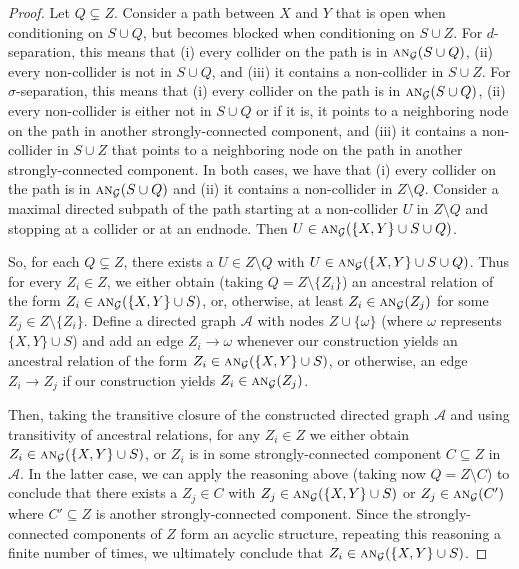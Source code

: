 \documentclass[twoside,11pt]{article}
\newenvironment{customlem}[1]
  {\renewcommand\theinnercustomlem{#1}\innercustomlem}
  {\endinnercustomlem}
\newcommand\C[1]{\mathcal{#1}}
\newcommand\mathbfsc[1]{\text{\normalfont\scshape#1}}
\newcommand\ansub[2]{\mathbfsc{an}_{#1}(#2)}
\begin{document}
\begin{customlem}{\ref{lemm:min_sep}}
\cmdLemmaMinSep
\end{customlem}
\begin{proof}
Let $Q \subsetneq Z$.
Consider a path between $X$ and $Y$ that is open when conditioning on $S \cup Q$, but becomes blocked when conditioning on $S \cup Z$. 
  For $d$-separation, this means that (i) every collider on the path is in $\ansub{\C{G}}{S \cup Q}$, (ii) every non-collider is not in $S \cup Q$, and (iii) it contains a non-collider in $S\cup Z$.
  For $\sigma$-separation, this means that (i) every collider on the path is in $\ansub{\C{G}}{S \cup Q}$, (ii) every non-collider is either not in $S \cup Q$ or if it is, it points to a neighboring node on the path in another strongly-connected component, and (iii) it contains a non-collider in $S\cup Z$ that points to a neighboring node on the path in another strongly-connected component. 
  In both cases, we have that (i) every collider on the path is in $\ansub{\C{G}}{S \cup Q}$ and (ii) it contains a non-collider in $Z \setminus Q$.
Consider a maximal directed subpath of the path starting at a non-collider $U$ in $Z \setminus Q$ and stopping at a collider or at an endnode.
  Then $U \in \ansub{\C{G}}{\{X,Y\} \cup S \cup Q}$. 

  So, for each $Q \subsetneq Z$, there exists a $U \in Z\setminus Q$ with $U \in \ansub{\C{G}}{\{X,Y\} \cup S \cup Q}$.
Thus for every $Z_i \in Z$, we either obtain (taking $Q = Z \setminus \{Z_i\}$) an ancestral relation of the form $Z_i \in \ansub{\C{G}}{\{X,Y\} \cup S}$, or, otherwise, at least $Z_i \in \ansub{\C{G}}{Z_j}$ for some $Z_j \in Z \setminus \{Z_i\}$. Define a directed graph $\C{A}$ with nodes $Z \cup \{\omega\}$ (where $\omega$ represents $\{X,Y\}\cup S$) and add an edge $Z_i \to \omega$ whenever our construction yields an ancestral relation of the form $Z_i \in \ansub{\C{G}}{\{X,Y\} \cup S}$, or otherwise, an edge $Z_i \to Z_j$ if our construction yields $Z_i \in \ansub{\C{G}}{Z_j}$.
 
  Then, taking the transitive closure of the constructed directed graph $\C{A}$ and using transitivity of ancestral relations, for any $Z_i \in Z$ we either obtain $Z_i \in \ansub{\C{G}}{\{X,Y\} \cup S}$, or $Z_i$ is in some strongly-connected component $C \subseteq Z$ in $\C{A}$. In the latter case, we can apply the reasoning above (taking now $Q = Z \setminus C$) to conclude that there exists a $Z_j \in C$ with $Z_j \in \ansub{\C{G}}{\{X,Y\} \cup S}$ or $Z_j \in \ansub{\C{G}}{C'}$ where $C' \subseteq Z$ is another strongly-connected component. Since the strongly-connected components of $Z$ form an acyclic structure, repeating this reasoning a finite number of times, we ultimately conclude that $Z_i \in \ansub{\C{G}}{\{X,Y\} \cup S}$. 
\end{proof}
\end{document}
